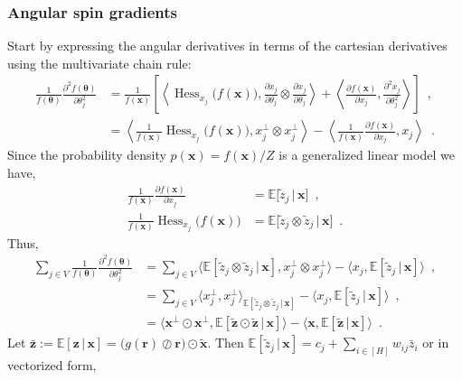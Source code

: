 \documentclass[12pt]{article}
\DeclareMathOperator*{\Hess}{Hess}
\theoremstyle{definition}%
\theoremstyle{definition}
\theoremstyle{remark}
\begin{document}
\subsubsection{Angular spin gradients}
Start by expressing the angular derivatives in terms of the cartesian derivatives using the multivariate chain rule:
\begin{align}
	\frac{1}{f(\bm{\theta})}\frac{\partial^2 f(\bm{\theta})}{\partial \theta_j^2}
		& = \frac{1}{f(\bm{x})}\left[\left \langle \Hess_{x_j}\big(f (\bm{x})\big), \frac{\partial x_j}{\partial \theta_j} \otimes \frac{\partial x_j}{\partial \theta_j} \right\rangle + \left \langle \frac{\partial f(\bm{x})}{\partial x_j}, \frac{\partial^2 x_j}{\partial \theta_j^2} \right\rangle \right] \enspace , \\
		& = \left \langle \frac{1}{f(\bm{x})}\Hess_{x_j}\big(f (\bm{x})\big), x_j^\perp \otimes x_j^\perp \right\rangle - \left \langle \frac{1}{f(\bm{x})}\frac{\partial f(\bm{x})}{\partial x_j}, x_j \right\rangle \enspace .
\end{align}
Since the probability density $p(\bm{x}) = f(\bm{x})/Z$ is a generalized linear model we have,
\begin{align}
	\frac{1}{f(\bm{x})} \frac{\partial f(\bm{x})}{\partial x_j}
		& = \mathbb{E} \big[ \tilde{z}_j \, \big| \, \bm{x} \big] \enspace , \\
	\frac{1}{f(\bm{x})}\Hess_{x_j}\big(f(\bm{x})\big)
		& = \mathbb{E} \big[ \tilde{z}_j \otimes \tilde{z}_j \, \big| \, \bm{x} \big] \enspace .
\end{align}
Thus,
\begin{align}
\sum_{j\in V}\frac{1}{f(\bm{\theta})}\frac{\partial^2 f(\bm{\theta})}{\partial \theta_j^2} 
	& = \sum_{j\in V}\big\langle \mathbb{E}[\tilde{z}_j \otimes \tilde{z}_j \, | \, \bm{x}], x_j^\perp \otimes x_j^\perp \big\rangle - \big\langle x_j, \mathbb{E}[\tilde{z}_j \, | \, \bm{x}] \big\rangle \enspace , \\
	& = \sum_{j\in V}\big\langle x_j^\perp, x_j^\perp \big\rangle_{\mathbb{E}[\tilde{z}_j \otimes \tilde{z}_j \, | \, \bm{x}]} - \big\langle x_j, \mathbb{E}[\tilde{z}_j \, | \, \bm{x}] \big\rangle \enspace , \\
	& = \big\langle \bm{x}^\perp \odot \bm{x}^\perp, \mathbb{E}[ \tilde{\bm{z}} \odot \tilde{\bm{z}} \, | \, \bm{x} ] \big\rangle - \big\langle \bm{x}, \mathbb{E}[\tilde{\bm{z}} \, | \, \bm{x} ]\big\rangle \enspace .
\end{align}
Let $\bar{\bm{z}} := \mathbb{E}[\bm{z} \, | \, \bm{x}] = \big(g(\bm{r}) \oslash \bm{r} \big) \odot \tilde{\bm{x}}$. Then $\mathbb{E}[\tilde{z}_j \, | \, \bm{x}] = c_j + \sum_{i \in [H]} w_{ij} \bar{z}_i$ or in vectorized form,
\end{document}
